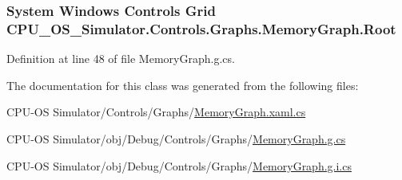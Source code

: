 \subsubsection[{Root}]{\setlength{\rightskip}{0pt plus 5cm}System Windows Controls Grid C\+P\+U\+\_\+\+O\+S\+\_\+\+Simulator.\+Controls.\+Graphs.\+Memory\+Graph.\+Root\hspace{0.3cm}{\ttfamily [package]}}\label{class_c_p_u___o_s___simulator_1_1_controls_1_1_graphs_1_1_memory_graph_a8d150d903f462523d77188c9a04ea5c3}


Definition at line 48 of file Memory\+Graph.\+g.\+cs.



The documentation for this class was generated from the following files\+:\begin{DoxyCompactItemize}
\item 
C\+P\+U-\/\+O\+S Simulator/\+Controls/\+Graphs/\hyperlink{_memory_graph_8xaml_8cs}{Memory\+Graph.\+xaml.\+cs}\item 
C\+P\+U-\/\+O\+S Simulator/obj/\+Debug/\+Controls/\+Graphs/\hyperlink{_memory_graph_8g_8cs}{Memory\+Graph.\+g.\+cs}\item 
C\+P\+U-\/\+O\+S Simulator/obj/\+Debug/\+Controls/\+Graphs/\hyperlink{_memory_graph_8g_8i_8cs}{Memory\+Graph.\+g.\+i.\+cs}\end{DoxyCompactItemize}
